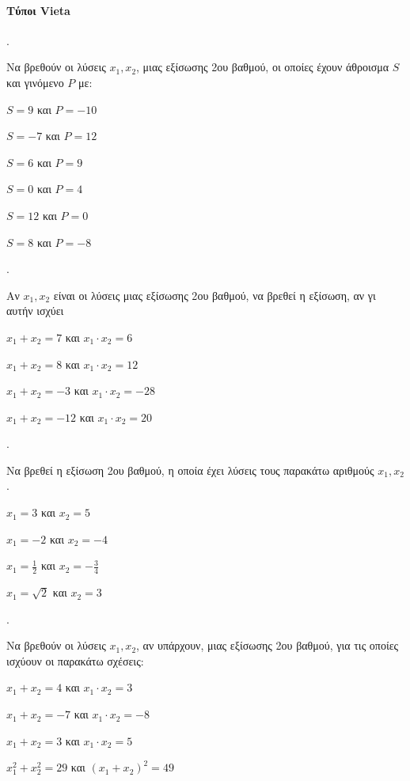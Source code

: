 \documentclass[11pt,a4paper,twocolumn]{article}
\newcounter{askhsh}
\newcommand{\askhsh}{\large\theaskhsh.\ \addtocounter{askhsh}{1}}
\newcommand{\eng}[1]{\selectlanguage{english}#1\selectlanguage{greek}}
\begin{document}
\paragraph{Τύποι \eng{Vieta}}
\askhsh
Να βρεθούν οι λύσεις $ x_1, x_2 $, μιας εξίσωσης 2{ου} βαθμού, οι οποίες έχουν άθροισμα $ S $ και γινόμενο $ P $ με:
\begin{multicols}{2}
\begin{alist}[leftmargin=5mm]
\item $ S=9 $ και $ P=-10 $
\item $ S=-7 $ και $ P=12 $
\item $ S=6 $ και $ P=9 $
\item $ S=0 $ και $ P=4 $
\item $ S=12 $ και $ P=0 $
\item $ S=8 $ και $ P=-8 $
\end{alist}
\end{multicols}
\askhsh 
Αν $ x_1, x_2 $ είναι οι λύσεις μιας εξίσωσης 2{ου} βαθμού, να βρεθεί η εξίσωση, αν γι αυτήν ισχύει
\begin{alist}
\item $ x_1+x_2=7 $ και $ x_1\cdot x_2=6 $
\item $ x_1+x_2=8 $ και $ x_1\cdot x_2=12 $
\item $ x_1+x_2=-3 $ και $ x_1\cdot x_2=-28 $
\item $ x_1+x_2=-12 $ και $ x_1\cdot x_2=20 $
\end{alist}
\askhsh
Να βρεθεί η εξίσωση 2{ου} βαθμού, η οποία έχει λύσεις τους παρακάτω αριθμούς $ x_1,x_2 $.
\begin{alist}
\item $ x_1=3 $ και $ x_2=5 $
\item $ x_1=-2 $ και $ x_2=-4 $
\item $ x_1=\frac{1}{2} $ και $ x_2=-\frac{3}{4} $
\item $ x_1=\sqrt{2} $ και $ x_2=3 $
\end{alist}
\askhsh
Να βρεθούν οι λύσεις $ x_1, x_2 $, αν υπάρχουν, μιας εξίσωσης 2{ου} βαθμού, για τις οποίες ισχύουν οι παρακάτω σχέσεις:
\begin{alist}
\item $ x_1+x_2=4 $ και $ x_1\cdot x_2=3 $
\item $ x_1+x_2=-7 $ και $ x_1\cdot x_2=-8 $
\item $ x_1+x_2=3 $ και $ x_1\cdot x_2=5 $
\item $ x_1^2+x_2^2=29 $ και $ (x_1+x_2)^2=49 $
\end{alist}
\end{document}
